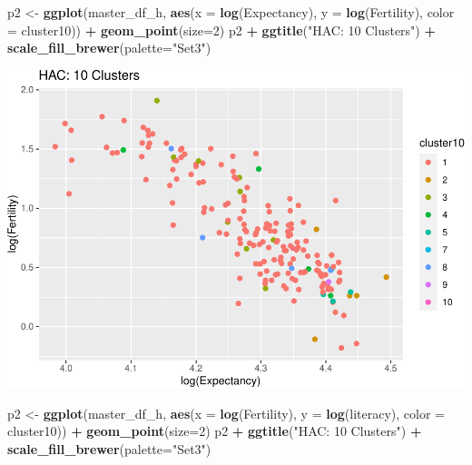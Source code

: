 \documentclass[]{article}
\newenvironment{Shaded}{\begin{snugshade}}{\end{snugshade}}
\newcommand{\DataTypeTok}[1]{\textcolor[rgb]{0.13,0.29,0.53}{#1}}
\newcommand{\DecValTok}[1]{\textcolor[rgb]{0.00,0.00,0.81}{#1}}
\newcommand{\KeywordTok}[1]{\textcolor[rgb]{0.13,0.29,0.53}{\textbf{#1}}}
\newcommand{\NormalTok}[1]{#1}
\newcommand{\OperatorTok}[1]{\textcolor[rgb]{0.81,0.36,0.00}{\textbf{#1}}}
\newcommand{\StringTok}[1]{\textcolor[rgb]{0.31,0.60,0.02}{#1}}
\begin{document}
\begin{Shaded}
\begin{Highlighting}[]
\NormalTok{p2 <-}\StringTok{ }\KeywordTok{ggplot}\NormalTok{(master_df_h, }\KeywordTok{aes}\NormalTok{(}\DataTypeTok{x =} \KeywordTok{log}\NormalTok{(Expectancy), }\DataTypeTok{y =} \KeywordTok{log}\NormalTok{(Fertility), }\DataTypeTok{color =}\NormalTok{ cluster10)) }\OperatorTok{+}
\StringTok{  }\KeywordTok{geom_point}\NormalTok{(}\DataTypeTok{size=}\DecValTok{2}\NormalTok{)}
\NormalTok{p2 }\OperatorTok{+}\StringTok{ }\KeywordTok{ggtitle}\NormalTok{(}\StringTok{"HAC: 10 Clusters"}\NormalTok{) }\OperatorTok{+}\StringTok{ }\KeywordTok{scale_fill_brewer}\NormalTok{(}\DataTypeTok{palette=}\StringTok{"Set3"}\NormalTok{)}
\end{Highlighting}
\end{Shaded}

\includegraphics{eda_files/figure-latex/unnamed-chunk-30-9.pdf}

\begin{Shaded}
\begin{Highlighting}[]
\NormalTok{p2 <-}\StringTok{ }\KeywordTok{ggplot}\NormalTok{(master_df_h, }\KeywordTok{aes}\NormalTok{(}\DataTypeTok{x =} \KeywordTok{log}\NormalTok{(Fertility), }\DataTypeTok{y =} \KeywordTok{log}\NormalTok{(literacy), }\DataTypeTok{color =}\NormalTok{ cluster10)) }\OperatorTok{+}
\StringTok{  }\KeywordTok{geom_point}\NormalTok{(}\DataTypeTok{size=}\DecValTok{2}\NormalTok{)}
\NormalTok{p2 }\OperatorTok{+}\StringTok{ }\KeywordTok{ggtitle}\NormalTok{(}\StringTok{"HAC: 10 Clusters"}\NormalTok{) }\OperatorTok{+}\StringTok{ }\KeywordTok{scale_fill_brewer}\NormalTok{(}\DataTypeTok{palette=}\StringTok{"Set3"}\NormalTok{)}
\end{Highlighting}
\end{Shaded}
\end{document}
